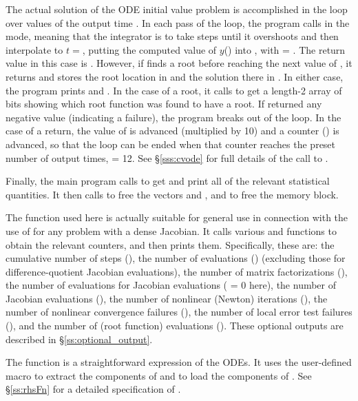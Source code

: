The actual solution of the ODE initial value problem is accomplished in
the loop over values of the output time .  In each pass of the
loop, the program calls  in the  mode, meaning that
the integrator is to take steps until it overshoots  and then
interpolate to $t = $, putting the computed value of $y$()
into , with  = .  The return value in this case is
.  However, if  finds a root before reaching the next
value of , it returns  and stores the root
location in  and the solution there in .  In either case, the
program prints  and .  In the case of a root, it calls
 to get a length-2 array  of bits showing
which root function was found to have a root.  If  returned any
negative value (indicating a failure), the program breaks out of the loop.  
In the case of a  return, the value of  is
advanced (multiplied by 10) and a counter () is advanced, so
that the loop can be ended when that counter reaches the preset number
of output times,  = 12.  See \S\ref{sss:cvode} for full
details of the call to .

Finally, the main program calls  to get and print
all of the relevant statistical quantities.  It then calls 
to free the vectors  and , and  to free the 
{\cvode} memory block.

The function  used here is actually suitable for
general use in connection with the use of {\cvode} for any problem with 
a dense Jacobian.  It calls various  and 
functions to obtain the relevant counters, and then prints them.
Specifically, these are: the cumulative number of steps (), 
the number of  evaluations () (excluding those for
difference-quotient Jacobian evaluations),
the number of matrix factorizations (),
the number of  evaluations for Jacobian evaluations (
= 0 here),
the number of Jacobian evaluations (),
the number of nonlinear (Newton) iterations (),
the number of nonlinear convergence failures (),
the number of local error test failures (), and
the number of  (root function) evaluations ().
These optional outputs are described in \S\ref{ss:optional_output}.

The function  is a straightforward expression of the ODEs. 
It uses the user-defined macro  to extract the components of 
and to load the components of .
See \S\ref{ss:rhsFn} for a detailed specification of .

